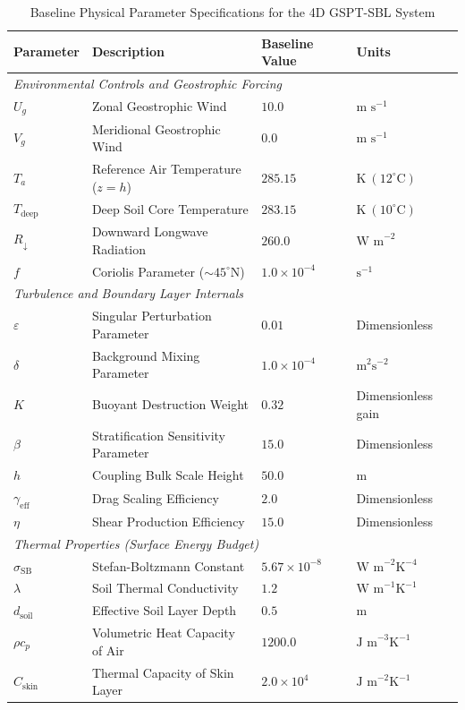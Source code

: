 \documentclass{article}
\begin{document}
\begin{table}[ht!]
\centering
\caption{Baseline Physical Parameter Specifications for the 4D GSPT-SBL System}
\label{tab:baseline_parameters}
\begin{tabular}{llll}
\toprule
\textbf{Parameter} & \textbf{Description} & \textbf{Baseline Value} & \textbf{Units} \\ \midrule
\multicolumn{4}{l}{\textit{Environmental Controls and Geostrophic Forcing}} \\
$U_g$ & Zonal Geostrophic Wind & $10.0$ & $\text{m s}^{-1}$ \\
$V_g$ & Meridional Geostrophic Wind & $0.0$ & $\text{m s}^{-1}$ \\
$T_a$ & Reference Air Temperature ($z = h$) & $285.15$ & $\text{K}\ (12^\circ\text{C})$ \\
$T_{\text{deep}}$ & Deep Soil Core Temperature & $283.15$ & $\text{K}\ (10^\circ\text{C})$ \\
$R_{\downarrow}$ & Downward Longwave Radiation & $260.0$ & $\text{W m}^{-2}$ \\
$f$ & Coriolis Parameter ($\sim 45^\circ\text{N}$) & $1.0 \times 10^{-4}$ & $\text{s}^{-1}$ \\ \midrule
\multicolumn{4}{l}{\textit{Turbulence and Boundary Layer Internals}} \\
$\varepsilon$ & Singular Perturbation Parameter & $0.01$ & Dimensionless \\
$\delta$ & Background Mixing Parameter & $1.0 \times 10^{-4}$ & $\text{m}^2\text{s}^{-2}$ \\
$K$ & Buoyant Destruction Weight & $0.32$ & Dimensionless gain \\
$\beta$ & Stratification Sensitivity Parameter & $15.0$ & Dimensionless \\
$h$ & Coupling Bulk Scale Height & $50.0$ & $\text{m}$ \\
$\gamma_{\mathrm{eff}}$ & Drag Scaling Efficiency & $2.0$ & Dimensionless \\
$\eta$ & Shear Production Efficiency & $15.0$ & Dimensionless \\ \midrule
\multicolumn{4}{l}{\textit{Thermal Properties (Surface Energy Budget)}} \\
$\sigma_{\text{SB}}$ & Stefan-Boltzmann Constant & $5.67 \times 10^{-8}$ & $\text{W m}^{-2}\text{K}^{-4}$ \\
$\lambda$ & Soil Thermal Conductivity & $1.2$ & $\text{W m}^{-1}\text{K}^{-1}$ \\
$d_{\text{soil}}$ & Effective Soil Layer Depth & $0.5$ & $\text{m}$ \\
$\rho c_p$ & Volumetric Heat Capacity of Air & $1200.0$ & $\text{J m}^{-3}\text{K}^{-1}$ \\
$C_{\text{skin}}$ & Thermal Capacity of Skin Layer & $2.0 \times 10^{4}$ & $\text{J m}^{-2}\text{K}^{-1}$ \\ \bottomrule
\end{tabular}
\end{table}
\end{document}
